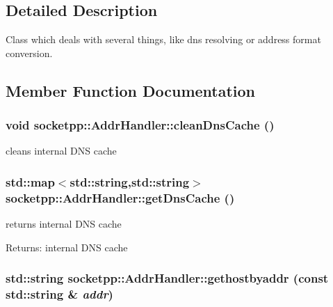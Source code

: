 \subsection{Detailed Description}
Class which deals with several things, like dns resolving or address format conversion. 

\subsection{Member Function Documentation}
\hypertarget{classsocketpp_1_1AddrHandler_89a2929af6c042fd7e16661303dfabcb}{
\subsubsection[{cleanDnsCache}]{\setlength{\rightskip}{0pt plus 5cm}void socketpp::AddrHandler::cleanDnsCache ()}}
\label{classsocketpp_1_1AddrHandler_89a2929af6c042fd7e16661303dfabcb}


cleans internal DNS cache 

\hypertarget{classsocketpp_1_1AddrHandler_4e10f2291b27d7db2a2860502721f960}{
\subsubsection[{getDnsCache}]{\setlength{\rightskip}{0pt plus 5cm}std::map$<$std::string,std::string$>$ socketpp::AddrHandler::getDnsCache ()}}
\label{classsocketpp_1_1AddrHandler_4e10f2291b27d7db2a2860502721f960}


returns internal DNS cache 

\begin{Desc}
\item[Returns:]internal DNS cache \end{Desc}
\hypertarget{classsocketpp_1_1AddrHandler_2e9b9e6dc7ea4fc4a3500665b3f4062d}{
\subsubsection[{gethostbyaddr}]{\setlength{\rightskip}{0pt plus 5cm}std::string socketpp::AddrHandler::gethostbyaddr (const std::string \& {\em addr})}}
\label{classsocketpp_1_1AddrHandler_2e9b9e6dc7ea4fc4a3500665b3f4062d}


